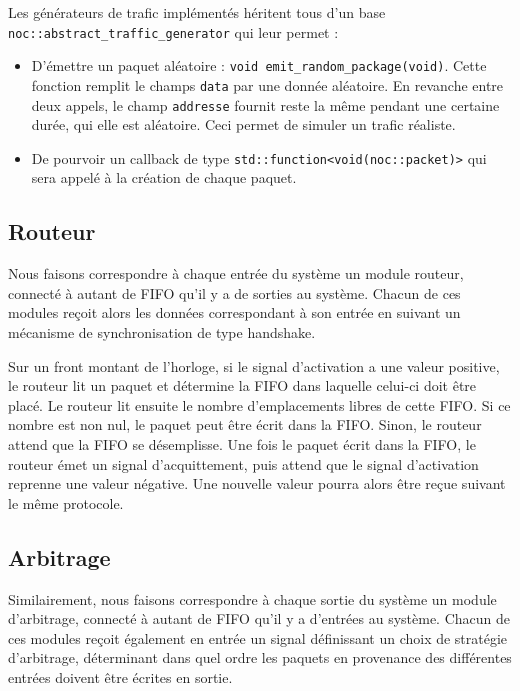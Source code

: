 \documentclass[11pt]{article}
\begin{document}
\vspace{0.5cm}

Les générateurs de trafic implémentés héritent tous d'un base
\texttt{noc::abstract\_traffic\_generator} qui leur permet :
\begin{itemize}
  \item D'émettre un paquet aléatoire : \texttt{void
    emit\_random\_package(void)}. Cette fonction remplit le champs \texttt{data}
    par une donnée aléatoire. En revanche entre deux appels, le champ
    \texttt{addresse} fournit reste la même pendant une certaine durée, qui elle
    est aléatoire. Ceci permet de simuler un trafic réaliste.
  \item De pourvoir un callback de type
    \texttt{std::function<void(noc::packet)>} qui sera appelé à la création de
    chaque paquet.
\end{itemize}


\subsection{Routeur}
Nous faisons correspondre à chaque entrée du système un module routeur, connecté à autant de FIFO qu'il y a de sorties au système.
Chacun de ces modules reçoit alors les données correspondant à son entrée en suivant un mécanisme de synchronisation de type handshake.

Sur un front montant de l'horloge, si le signal d'activation a une valeur positive,
le routeur lit un paquet et détermine la FIFO dans laquelle celui-ci doit être placé.
Le routeur lit ensuite le nombre d'emplacements libres de cette FIFO.
Si ce nombre est non nul, le paquet peut être écrit dans la FIFO.
Sinon, le routeur attend que la FIFO se désemplisse.
Une fois le paquet écrit dans la FIFO, le routeur émet un signal d'acquittement,
puis attend que le signal d'activation reprenne une valeur négative.
Une nouvelle valeur pourra alors être reçue suivant le même protocole.

\subsection{Arbitrage}
Similairement, nous faisons correspondre à chaque sortie du système un module d'arbitrage, connecté à autant de FIFO qu'il y a d'entrées au système.
Chacun de ces modules reçoit également en entrée un signal définissant un choix de stratégie d'arbitrage, déterminant dans quel ordre
les paquets en provenance des différentes entrées doivent être écrites en sortie.
\end{document}
